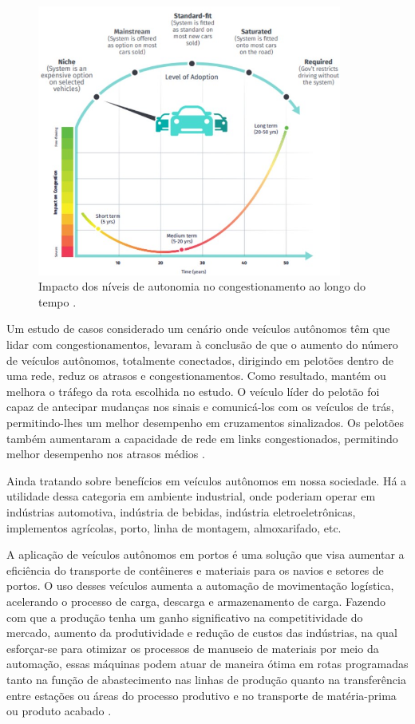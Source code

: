 \begin{figure}[H]
\centering
\includegraphics[width=10cm]{Figures/conge.jpg}
\caption{Impacto dos níveis de autonomia no congestionamento ao longo do tempo \cite{4cenarios_ocidental}.}
\label{congestionamento}
\end{figure}

Um estudo de casos considerado um cenário onde veículos autônomos têm que lidar com congestionamentos, levaram à conclusão de que o aumento do número de veículos autônomos, totalmente conectados, dirigindo em pelotões dentro de uma rede, reduz os atrasos e congestionamentos. Como resultado, mantém ou melhora o tráfego da rota escolhida no estudo. O veículo líder do pelotão foi capaz de antecipar mudanças nos sinais e comunicá-los com os veículos de trás, permitindo-lhes um melhor desempenho em cruzamentos sinalizados. Os pelotões também aumentaram a capacidade de rede em links congestionados, permitindo melhor desempenho nos atrasos médios \cite{conge}.


Ainda tratando sobre benefícios em veículos
autônomos em nossa sociedade.
Há a utilidade dessa categoria em ambiente industrial, onde poderiam  operar em indústrias automotiva, indústria de bebidas, indústria eletroeletrônicas, implementos agrícolas, porto, linha de montagem, almoxarifado, etc.

A aplicação de veículos autônomos em portos é uma solução que visa aumentar a eficiência do transporte de contêineres e materiais para os navios e setores de portos. O uso desses veículos aumenta a automação de movimentação logística, acelerando o processo de carga, descarga e armazenamento de carga. Fazendo com que a produção tenha um ganho significativo 
na competitividade do mercado, aumento da produtividade e redução de custos das indústrias, na qual esforçar-se para otimizar os processos de manuseio de materiais por meio da automação, essas máquinas podem atuar de maneira ótima em rotas programadas tanto na função de abastecimento nas linhas de produção quanto na transferência entre estações ou áreas do processo produtivo e no transporte de matéria-prima ou produto acabado \cite{aplicacao}.

